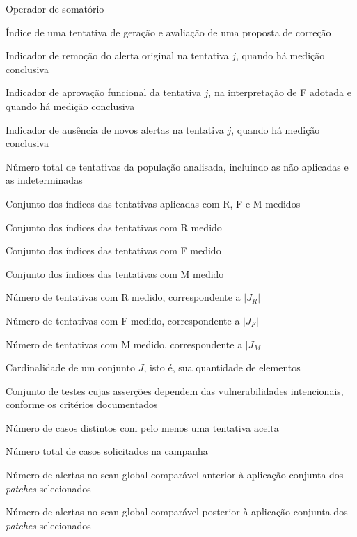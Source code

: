 \begin{simbolos}
  \item[$\sum$] Operador de somatório
  \item[$j$] Índice de uma tentativa de geração e avaliação de uma proposta de correção
  \item[$R_j$] Indicador de remoção do alerta original na tentativa $j$, quando há medição conclusiva
  \item[$F_j$] Indicador de aprovação funcional da tentativa $j$, na interpretação de F adotada e quando há medição conclusiva
  \item[$M_j$] Indicador de ausência de novos alertas na tentativa $j$, quando há medição conclusiva
  \item[$m$] Número total de tentativas da população analisada, incluindo as não aplicadas e as indeterminadas
  \item[$J_V$] Conjunto dos índices das tentativas aplicadas com R, F e M medidos
  \item[$J_R$] Conjunto dos índices das tentativas com R medido
  \item[$J_F$] Conjunto dos índices das tentativas com F medido
  \item[$J_M$] Conjunto dos índices das tentativas com M medido
  \item[$n_R$] Número de tentativas com R medido, correspondente a $|J_R|$
  \item[$n_F$] Número de tentativas com F medido, correspondente a $|J_F|$
  \item[$n_M$] Número de tentativas com M medido, correspondente a $|J_M|$
  \item[$|J|$] Cardinalidade de um conjunto $J$, isto é, sua quantidade de elementos
  \item[$D$] Conjunto de testes cujas asserções dependem das vulnerabilidades intencionais, conforme os critérios documentados
  \item[$c_{\text{aceitos}}$] Número de casos distintos com pelo menos uma tentativa aceita
  \item[$c_{\text{solicitados}}$] Número total de casos solicitados na campanha
  \item[$I_{\text{antes}}$] Número de alertas no scan global comparável anterior à aplicação conjunta dos \textit{patches} selecionados
  \item[$I_{\text{depois}}$] Número de alertas no scan global comparável posterior à aplicação conjunta dos \textit{patches} selecionados
\end{simbolos}
